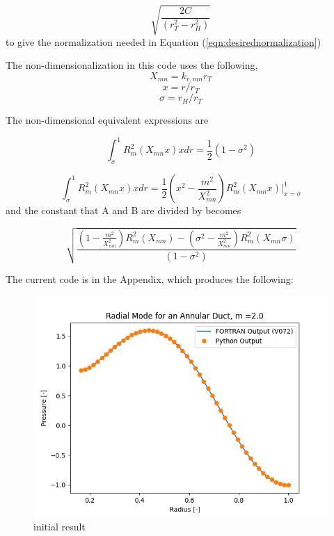 \documentclass[12pt]{article}
\begin{document}
\begin{equation}
    \sqrt{\frac{2C}{\left( r_T^2 - r_H^2 \right)}}
    \label{eqn:normalizationconst}
\end{equation}
to give the normalization needed in Equation (\ref{eqn:desirednormalization}) 

The non-dimensionalization in this code uses the following,
\[ X_{mn} = k_{r,mn} r_T\]
\[ x = r/r_T\]
\[ \sigma = r_H/r_T\]

The non-dimensional equivalent expressions are 

\begin{equation}
    \int_{\sigma}^{1} R_m^2(X_{mn} x) x dr = \frac{1}{2}\left( 1 - \sigma^2 \right)
    \label{eqn:desirednormalization_nondimensional}
\end{equation}

\begin{equation}
    \int_{\sigma}^{1} R_m^2(X_{mn} x) x dr = 
    \frac{1}{2}\left( x^2 - \frac{m^2}{X_{mn}^2} \right)R_m^2 (X_{mn} x)\Big|_{x = \sigma}^{1}
\end{equation}
and the constant that A and B are divided by becomes 

\begin{equation}
    \sqrt{\frac{
\left( 1 - \frac{m^2}{X_{mn}^2} \right)R_m^2 (X_{mn} )  -
\left( \sigma^2 - \frac{m^2}{X_{mn}^2} \right)R_m^2 (X_{mn} \sigma)
}{\left( 1 - \sigma^2 \right)}}
    \label{eqn:normalizationconst_nondimension}
\end{equation}

The current code is in the Appendix, which produces the following:

\begin{figure}
    \centering
    \includegraphics{../figures/Figure1.png}
    \caption{initial result}
    \label{fig:dd}
\end{figure}
\end{document}
